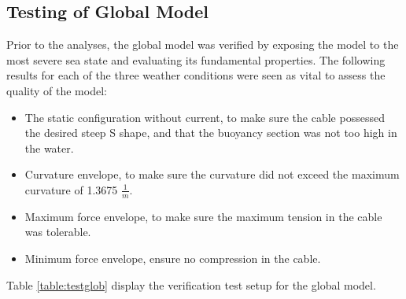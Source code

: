 \subsection{Testing of Global Model}
Prior to the analyses, the global model was verified by exposing the model to the most severe sea state and evaluating its fundamental properties. The following results for each of the three weather conditions were seen as vital to assess the quality of the model:
\begin{itemize}
    \item The static configuration without current, to make sure the cable possessed the desired steep S shape, and that the buoyancy section was not too high in the water.
    \item Curvature envelope, to make sure the curvature did not exceed the maximum curvature of 1.3675 $\frac{1}{m}$.
    \item Maximum force envelope, to make sure the maximum tension in the cable was tolerable.
    \item Minimum force envelope, ensure no compression in the cable.
\end{itemize}  Table \ref{table:testglob} display the verification test setup for the global model.

